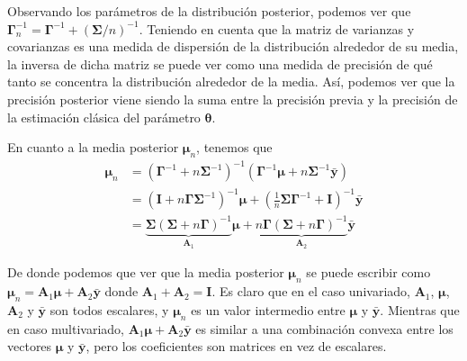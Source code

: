 \documentclass[
  10pt,
  spanish,
]{book}
\theoremstyle{definition}
\theoremstyle{definition}
\theoremstyle{definition}
\theoremstyle{definition}
\theoremstyle{remark}
\begin{document}
Observando los parámetros de la distribución posterior, podemos ver que \(\boldsymbol \Gamma_n^{-1} = \boldsymbol \Gamma^{-1}+(\boldsymbol \Sigma/n)^{-1}\). Teniendo en cuenta que la matriz de varianzas y covarianzas es una medida de dispersión de la distribución alrededor de su media, la inversa de dicha matriz se puede ver como una medida de precisión de qué tanto se concentra la distribución alrededor de la media. Así, podemos ver que la precisión posterior viene siendo la suma entre la precisión previa y la precisión de la estimación clásica del parámetro \(\boldsymbol \theta\).

En cuanto a la media posterior \(\boldsymbol \mu_n\), tenemos que
\begin{align*}
\boldsymbol \mu_n&=\left(\boldsymbol \Gamma^{-1}+n\boldsymbol \Sigma^{-1}\right)^{-1}
(\boldsymbol \Gamma^{-1}\boldsymbol \mu+n \boldsymbol \Sigma^{-1}\bar{\mathbf{y}})\\
&=\left(\mathbf{I}+n\boldsymbol \Gamma\boldsymbol \Sigma^{-1}\right)^{-1}\boldsymbol \mu+\left(\frac{1}{n}\boldsymbol \Sigma\boldsymbol \Gamma^{-1}+\mathbf{I}\right)^{-1}\bar{\mathbf{y}}\\
&=\underbrace{\boldsymbol \Sigma\left(\boldsymbol \Sigma+n\boldsymbol \Gamma\right)^{-1}}_{\mathbf{A}_1}\boldsymbol \mu+\underbrace{n\boldsymbol \Gamma\left(\boldsymbol \Sigma+n\boldsymbol \Gamma\right)^{-1}}_{\mathbf{A}_2}\bar{\mathbf{y}}
\end{align*}

De donde podemos que ver que la media posterior \(\boldsymbol \mu_n\) se puede escribir como \(\boldsymbol \mu_n=\mathbf{A}_1\boldsymbol \mu+\mathbf{A}_2\bar{\mathbf{y}}\) donde \(\mathbf{A}_1+\mathbf{A}_2=\mathbf{I}\). Es claro que en el caso univariado, \(\mathbf{A}_1\), \(\boldsymbol \mu\), \(\mathbf{A}_2\) y \(\bar{\mathbf{y}}\) son todos escalares, y \(\boldsymbol \mu_n\) es un valor intermedio entre \(\boldsymbol \mu\) y \(\bar{\mathbf{y}}\). Mientras que en caso multivariado, \(\mathbf{A}_1\boldsymbol \mu+\mathbf{A}_2\bar{\mathbf{y}}\) es similar a una combinación convexa entre los vectores \(\boldsymbol \mu\) y \(\bar{\mathbf{y}}\), pero los coeficientes son matrices en vez de escalares.
\end{document}
